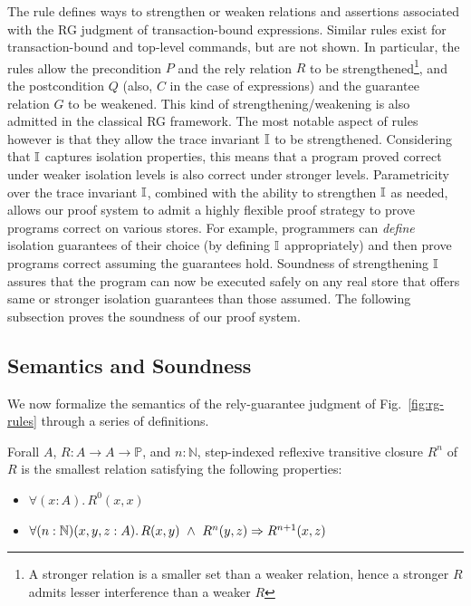 The  rule defines ways to strengthen or weaken
relations and assertions associated with the RG judgment of
transaction-bound expressions. Similar rules exist for
transaction-bound and top-level commands, but are not shown. In
particular, the rules allow the precondition $P$ and the rely relation
$R$ to be strengthened\footnote{A stronger relation is a smaller set
than a weaker relation, hence a stronger $R$ admits lesser
interference than a weaker $R$}, and the postcondition $Q$ (also, $C$
in the case of expressions) and the guarantee relation $G$ to be
weakened. This kind of strengthening/weakening is also admitted in the
classical RG framework. The most notable aspect of
 rules however is that they allow the trace
invariant $\mathbb{I}$ to be strengthened. Considering that $\mathbb{I}$ captures
isolation properties, this means that a program proved correct under
weaker isolation levels is also correct under stronger levels.
Parametricity over the trace invariant $\mathbb{I}$, combined with the ability
to strengthen $\mathbb{I}$ as needed, allows our proof system to admit a
highly flexible proof strategy to prove programs correct on various
stores. For example, programmers can \emph{define} isolation
guarantees of their choice (by defining $\mathbb{I}$ appropriately) and then
prove programs correct assuming the guarantees hold. Soundness of
strengthening $\mathbb{I}$ assures that the program can now be executed safely
on any real store that offers same or stronger isolation guarantees
than those assumed. The following subsection proves the soundness of
our proof system.

\subsection{Semantics and Soundness}

We now formalize the semantics of the rely-guarantee judgment of
Fig.~\ref{fig:rg-rules} through a series of definitions.

\begin{definition}
Forall $A$, $R: A \rightarrow A \rightarrow \mathbb{P}$, and $n :
\mathbb{N}$, step-indexed reflexive transitive closure $R^n$ of $R$ is
the smallest relation satisfying the following
properties:
\begin{itemize}
\item $\forall (x:A).\, R^0 (x,x)$
\item $\forall (n:\mathbb{N})(x,y,z : A).\, R(x,y) ~\wedge~ R^n(y,z) \Rightarrow
R^{n+1}(x,z)$
\end{itemize}
\end{definition}

